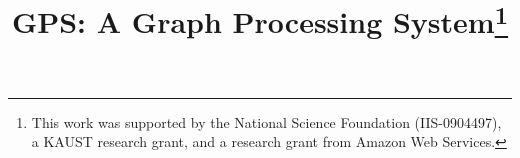\documentclass{sig-alternate}
\begin{document}
%

\title{GPS: A Graph Processing System\thanks{This work was supported by the National Science Foundation (IIS-0904497), a KAUST research grant, and a research grant from Amazon Web Services.}}

%
%
%
%
%
\end{document}
